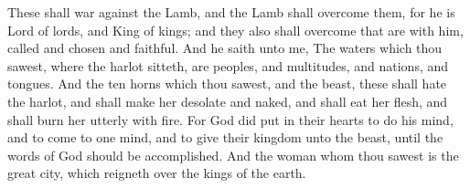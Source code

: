  These shall war against the Lamb, and the Lamb shall overcome them, for he is Lord of lords, and King of kings; and they also shall overcome that are with him, called and chosen and faithful. 
 And he saith unto me, The waters which thou sawest, where the harlot sitteth, are peoples, and multitudes, and nations, and tongues. 
 And the ten horns which thou sawest, and the beast, these shall hate the harlot, and shall make her desolate and naked, and shall eat her flesh, and shall burn her utterly with fire. 
 For God did put in their hearts to do his mind, and to come to one mind, and to give their kingdom unto the beast, until the words of God should be accomplished. 
 And the woman whom thou sawest is the great city, which reigneth over the kings of the earth.